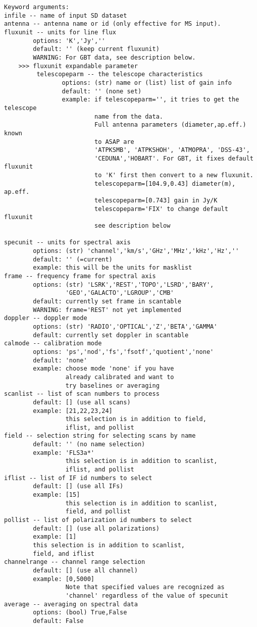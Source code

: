 \begin{verbatim}
Keyword arguments:
infile -- name of input SD dataset
antenna -- antenna name or id (only effective for MS input). 
fluxunit -- units for line flux
        options: 'K','Jy',''
        default: '' (keep current fluxunit)
        WARNING: For GBT data, see description below.
    >>> fluxunit expandable parameter
         telescopeparm -- the telescope characteristics
                options: (str) name or (list) list of gain info
                default: '' (none set)
                example: if telescopeparm='', it tries to get the telescope
                         name from the data.
                         Full antenna parameters (diameter,ap.eff.) known
                         to ASAP are
                         'ATPKSMB', 'ATPKSHOH', 'ATMOPRA', 'DSS-43',
                         'CEDUNA','HOBART'. For GBT, it fixes default fluxunit
                         to 'K' first then convert to a new fluxunit.
                         telescopeparm=[104.9,0.43] diameter(m), ap.eff.
                         telescopeparm=[0.743] gain in Jy/K
                         telescopeparm='FIX' to change default fluxunit
                         see description below

specunit -- units for spectral axis
        options: (str) 'channel','km/s','GHz','MHz','kHz','Hz',''
        default: '' (=current)
        example: this will be the units for masklist
frame -- frequency frame for spectral axis
        options: (str) 'LSRK','REST','TOPO','LSRD','BARY',
                 'GEO','GALACTO','LGROUP','CMB'
        default: currently set frame in scantable
        WARNING: frame='REST' not yet implemented
doppler -- doppler mode
        options: (str) 'RADIO','OPTICAL','Z','BETA','GAMMA'
        default: currently set doppler in scantable
calmode -- calibration mode
        options: 'ps','nod','fs','fsotf','quotient','none'
        default: 'none'
        example: choose mode 'none' if you have
                 already calibrated and want to
                 try baselines or averaging
scanlist -- list of scan numbers to process
        default: [] (use all scans)
        example: [21,22,23,24]
                 this selection is in addition to field,
                 iflist, and pollist
field -- selection string for selecting scans by name
        default: '' (no name selection)
        example: 'FLS3a*'
                 this selection is in addition to scanlist,
                 iflist, and pollist
iflist -- list of IF id numbers to select
        default: [] (use all IFs)
        example: [15]
                 this selection is in addition to scanlist,
                 field, and pollist
pollist -- list of polarization id numbers to select
        default: [] (use all polarizations)
        example: [1]
        this selection is in addition to scanlist,
        field, and iflist
channelrange -- channel range selection
        default: [] (use all channel)
        example: [0,5000]
                 Note that specified values are recognized as 
                 'channel' regardless of the value of specunit 
average -- averaging on spectral data 
        options: (bool) True,False
        default: False


\end{verbatim}
